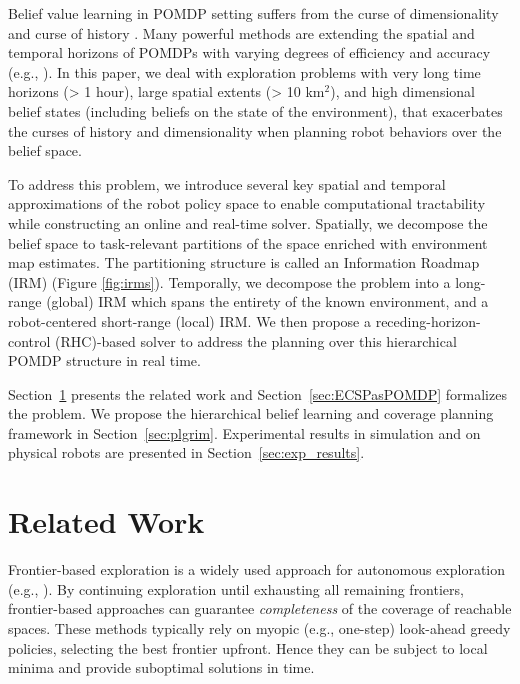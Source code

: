 \documentclass{article}
\newcommand{\ph}[1]{{\textbf{#1}:}} %
\begin{document}
Belief value learning in POMDP setting suffers from the curse of dimensionality \cite{KLC98} and curse of history \cite{Pineau03}. Many powerful methods are extending the spatial and temporal horizons of POMDPs with varying degrees of efficiency and accuracy (e.g., \cite{silver2010monte,somani2013despot,bonet1998learning,kim2019pomhdp}). In this paper, we deal with exploration problems with very long time horizons (> 1 hour), large spatial extents (> 10 km$^2$), and high dimensional belief states (including beliefs on the state of the environment), that exacerbates the curses of history and dimensionality when planning robot behaviors over the belief space.
%

To address this problem, we introduce several key spatial and temporal approximations of the robot policy space to enable computational tractability while constructing an online and real-time solver.
Spatially, we decompose the belief space to task-relevant partitions of the space
enriched with environment map estimates. %
The partitioning structure is called an Information Roadmap (IRM) (Figure \ref{fig:irms}). Temporally, we decompose the problem into a long-range (global) IRM which spans the entirety of the known environment, and a robot-centered short-range (local) IRM. %
We then propose a receding-horizon-control (RHC)-based solver to address the planning over this hierarchical POMDP structure %
in real time.

Section~\ref{sec:related_work} presents the related work and Section~\ref{sec:ECSPasPOMDP} formalizes the problem.
We propose the hierarchical belief learning and coverage planning framework in Section~\ref{sec:plgrim}. Experimental results in simulation and on physical robots are presented in Section~\ref{sec:exp_results}.%


\section{Related Work}\label{sec:related_work}
Frontier-based exploration is a widely used approach for autonomous exploration (e.g., \cite{yamauchi1997frontier,tao2007motion,keidar2012robot,heng2015efficient,gonzalez2002navigation,grabowski2003autonomous}). By continuing exploration until exhausting all remaining frontiers, frontier-based approaches can guarantee \textit{completeness} of the coverage of reachable spaces.  These methods typically rely on myopic (e.g., one-step) look-ahead greedy policies, selecting the best frontier upfront. Hence they can be subject to local minima and provide suboptimal solutions in time.
\end{document}

